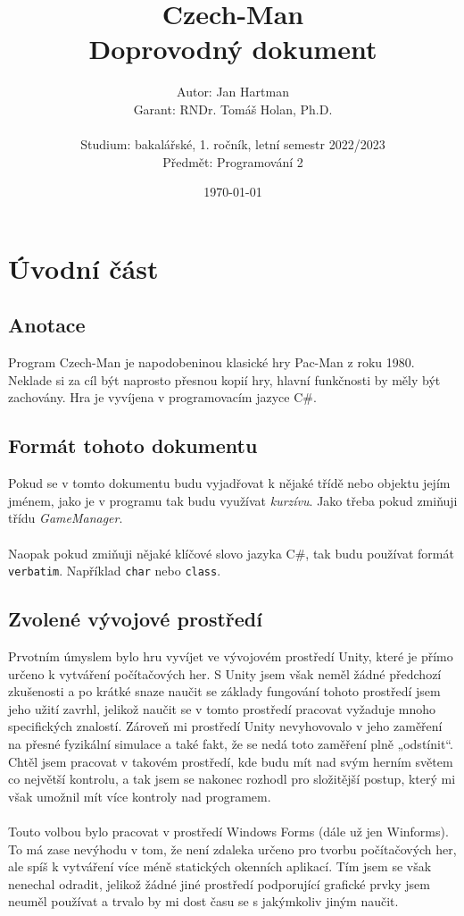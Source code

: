 \documentclass[a4]{article}
\title{Czech-Man
\\Doprovodný dokument}
\author{Autor: Jan Hartman
\\Garant: RNDr. Tomáš Holan, Ph.D.
\\\\Studium: bakalářské, 1. ročník, letní semestr 2022/2023
\\Předmět: Programování 2}
\date{\today}
\begin{document}
\maketitle
\tableofcontents
\pagestyle{fancy}
\newpage
\section{Úvodní část}
\subsection{Anotace}
Program Czech-Man je napodobeninou klasické hry Pac-Man z roku 1980. Neklade si za cíl být naprosto přesnou kopií hry, hlavní funkčnosti by měly být zachovány. Hra je vyvíjena v programovacím jazyce C\#.
\subsection{Formát tohoto dokumentu}
Pokud se v tomto dokumentu budu vyjadřovat k nějaké třídě nebo objektu jejím jménem, jako je v programu tak budu využívat \textit{kurzívu}. Jako třeba pokud zmiňuji třídu \textit{GameManager}.
\\\\
Naopak pokud zmiňuji nějaké klíčové slovo jazyka C\#, tak budu používat formát \verb|verbatim|. Například \verb|char| nebo \verb|class|.
\subsection{Zvolené vývojové prostředí}
Prvotním úmyslem bylo hru vyvíjet ve vývojovém prostředí Unity, které je přímo určeno k vytváření počítačových her. S Unity jsem však neměl žádné předchozí zkušenosti a po krátké snaze naučit se základy fungování tohoto prostředí jsem jeho užití zavrhl, jelikož naučit se v tomto prostředí pracovat vyžaduje mnoho specifických znalostí. Zároveň mi prostředí Unity nevyhovovalo v jeho zaměření na přesné fyzikální simulace a také fakt, že se nedá toto zaměření plně „odstínit“. Chtěl jsem pracovat v takovém prostředí, kde budu mít nad svým herním světem co největší kontrolu, a tak jsem se nakonec rozhodl pro složitější postup, který mi však umožnil mít více kontroly nad programem.
\\\\
Touto volbou bylo pracovat v prostředí Windows Forms (dále už jen Winforms). To má zase nevýhodu v tom, že není zdaleka určeno pro tvorbu počítačových her, ale spíš k vytváření více méně statických okenních aplikací. Tím jsem se však nenechal odradit, jelikož žádné jiné prostředí podporující grafické prvky jsem neuměl používat a trvalo by mi dost času se s jakýmkoliv jiným naučit.
\newpage
\end{document}
